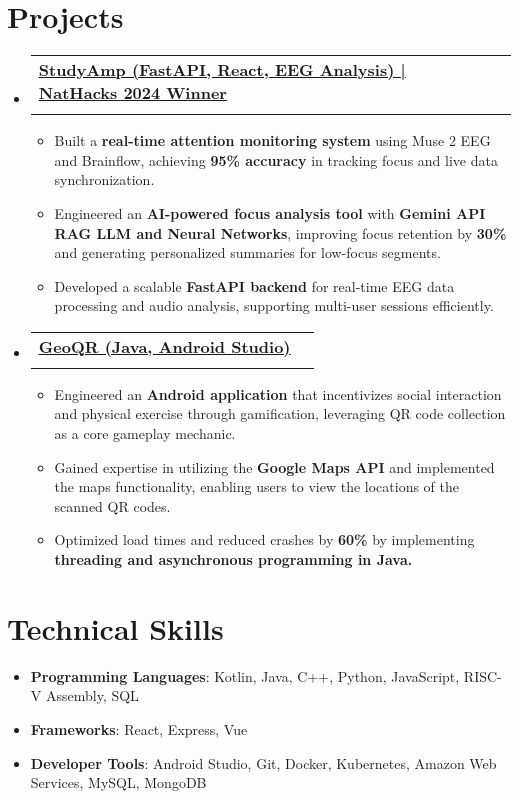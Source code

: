 \documentclass[letterpaper,10pt]{article}
\makeatletter
\newcommand{\resumeItem}[1]{
  \item\normalsize{
    {#1 \vspace{-2pt}}
  }
}
\newcommand{\resumeSubheading}[4]{
  \vspace{-2pt}\item
    \begin{tabular*}{0.97\textwidth}[t]{l@{\extracolsep{\fill}}r}
      \textbf{#1} & #2 \\
      \textit{\small#3} & \textit{\small #4} \\
    \end{tabular*}\vspace{-7pt}
}
\newcommand{\resumeSubHeadingListStart}{\begin{itemize}[leftmargin=0.15in, label={}]}
\newcommand{\resumeSubHeadingListEnd}{\end{itemize}}
\newcommand{\resumeItemListStart}{\begin{itemize}}
\newcommand{\resumeItemListEnd}{\end{itemize}\vspace{-5pt}}
\makeatother
\begin{document}
\vspace{-10pt}
\section{\LARGE Projects}
 \vspace{3pt}
  \resumeSubHeadingListStart

  \resumeSubheading
  {\href{https://github.com/NatRunners/StudyAmp}{\underline{ StudyAmp (FastAPI, React, EEG Analysis) | NatHacks 2024 Winner} }}{}
  {}{}
  \vspace{-5pt}
  \resumeItemListStart
    \resumeItem{Built a \textbf{real-time attention monitoring system} using Muse 2 EEG and Brainflow, achieving \textbf{95\% accuracy} in tracking focus and live data synchronization.}
    \resumeItem{Engineered an \textbf{AI-powered focus analysis tool} with \textbf{Gemini API RAG LLM and Neural Networks}, improving focus retention by \textbf{30\%} and generating personalized summaries for low-focus segments.}
    \resumeItem{Developed a scalable \textbf{FastAPI backend} for real-time EEG data processing and audio analysis, supporting multi-user sessions efficiently.}
  \resumeItemListEnd

    \resumeSubheading
      {\href{https://github.com/CMPUT301W23T32/lordofthewings}{\underline{ GeoQR (Java, Android Studio)} }}{}
      {}{}
      \vspace{-5pt}
      \resumeItemListStart
        \resumeItem{Engineered an \textbf{Android application} that incentivizes social interaction and physical exercise through gamification,
        leveraging QR code collection as a core gameplay mechanic.}
        \resumeItem{Gained expertise in utilizing the \textbf{Google Maps API} and implemented the maps functionality, enabling users to view the locations of the scanned QR codes.}
        \resumeItem{Optimized load times and reduced crashes by \textbf{60\%} by implementing \textbf{threading and asynchronous programming in Java.}}
    \resumeItemListEnd

  \resumeSubHeadingListEnd


\section{\LARGE Technical Skills}
\begin{itemize}[leftmargin=0.15in, label={}]
   \small{\item{
       {\resumeItemListStart
       \resumeItem{\textbf{Programming Languages}: Kotlin, Java, C++, Python, JavaScript, RISC-V Assembly, SQL}
       \vspace{1pt}
       \resumeItem{\textbf{Frameworks}: React, Express, Vue}
       \vspace{1pt}
       \resumeItem{\textbf{Developer Tools}: Android Studio, Git, Docker, Kubernetes, Amazon Web Services, MySQL, MongoDB}
   \resumeItemListEnd}
   }}
\end{itemize}
\end{document}
